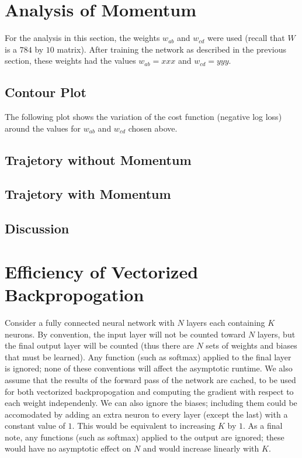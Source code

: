 \documentclass{article}
\begin{document}
   \section{Analysis of Momentum}
   For the analysis in this section, the weights $w_{ab}$ and $w_{cd}$ were used (recall that $W$ is
   a $784$ by $10$ matrix). After training the network as described in the previous section,
   these weights had the values $w_{ab} = xxx$ and $w_{cd} = yyy$.

   \subsection{Contour Plot}
   The following plot shows the variation of the cost function (negative log loss) around the
   values for $w_{ab}$ and $w_{cd}$ chosen above.

   \subsection{Trajetory without Momentum}

   \subsection{Trajetory with Momentum}

   \subsection{Discussion}




   \section{Efficiency of Vectorized Backpropogation}
   Consider a fully connected neural network with $N$ layers each containing $K$ neurons. By convention,
   the input layer will not be counted toward $N$ layers, but the final output layer will be
   counted (thus there are $N$ sets of weights and biases that must be learned). Any function
   (such as softmax) applied to the final layer is ignored; none of these conventions will
   affect the asymptotic runtime. We also assume that the results of the forward pass of the
   network are cached, to be used for both vectorized backpropogation and computing the
   gradient with respect to each weight independenly.
   We can also ignore the biases; including them could be accomodated by adding an extra
   neuron to every layer (except the last) with a constant value of $1$. This would be
   equivalent to increasing $K$ by $1$. As a final note, any functions (such as softmax) applied
   to the output are ignored; these would have no asymptotic effect on $N$ and would increase
   linearly with $K$.
\end{document}
